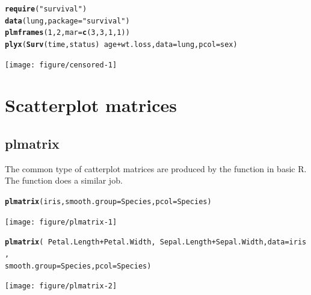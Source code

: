 \documentclass[11pt]{article}\usepackage[]{graphicx}\usepackage[]{color}
\makeatletter
\newcommand{\hlnum}[1]{\textcolor[rgb]{0.686,0.059,0.569}{#1}}%
\newcommand{\hlstr}[1]{\textcolor[rgb]{0.192,0.494,0.8}{#1}}%
\newcommand{\hlopt}[1]{\textcolor[rgb]{0,0,0}{#1}}%
\newcommand{\hlstd}[1]{\textcolor[rgb]{0.345,0.345,0.345}{#1}}%
\newcommand{\hlkwc}[1]{\textcolor[rgb]{0.333,0.667,0.333}{#1}}%
\newcommand{\hlkwd}[1]{\textcolor[rgb]{0.737,0.353,0.396}{\textbf{#1}}}%
\newenvironment{kframe}{%
 \def\at@end@of@kframe{}%
 \ifinner\ifhmode%
  \def\at@end@of@kframe{\end{minipage}}%
  \begin{minipage}{\columnwidth}%
 \fi\fi%
 \def\FrameCommand##1{\hskip\@totalleftmargin \hskip-\fboxsep
 \colorbox{shadecolor}{##1}\hskip-\fboxsep
     \hskip-\linewidth \hskip-\@totalleftmargin \hskip\columnwidth}%
 \MakeFramed {\advance\hsize-\width
   \@totalleftmargin\z@ \linewidth\hsize
   \@setminipage}}%
 {\par\unskip\endMakeFramed%
 \at@end@of@kframe}
\newenvironment{knitrout}{}{} %
\makeatother
\begin{document}
\begin{knitrout}
\color{fgcolor}\begin{kframe}
\begin{alltt}
\hlkwd{require}\hlstd{(}\hlstr{"survival"}\hlstd{)}
\hlkwd{data}\hlstd{(lung,} \hlkwc{package}\hlstd{=}\hlstr{"survival"}\hlstd{)}
\hlkwd{plmframes}\hlstd{(}\hlnum{1}\hlstd{,}\hlnum{2}\hlstd{,}\hlkwc{mar}\hlstd{=}\hlkwd{c}\hlstd{(}\hlnum{3}\hlstd{,}\hlnum{3}\hlstd{,}\hlnum{1}\hlstd{,}\hlnum{1}\hlstd{))}
\hlkwd{plyx}\hlstd{(}\hlkwd{Surv}\hlstd{(time,status)} \hlopt{~} \hlstd{age}\hlopt{+}\hlstd{wt.loss,} \hlkwc{data}\hlstd{=lung,} \hlkwc{pcol}\hlstd{=sex)}
\end{alltt}
\end{kframe}
\texttt{[image: figure/censored-1]} 

\end{knitrout}


\section{Scatterplot matrices}
\subsection{plmatrix}
The common type of catterplot matrices are produced by the  function 
in basic R. The function  does a similar job.

\begin{knitrout}
\color{fgcolor}\begin{kframe}
\begin{alltt}
\hlkwd{plmatrix}\hlstd{(iris,} \hlkwc{smooth.group}\hlstd{=Species,} \hlkwc{pcol}\hlstd{=Species)}
\end{alltt}
\end{kframe}
\texttt{[image: figure/plmatrix-1]} 
\begin{kframe}\begin{alltt}
\hlkwd{plmatrix}\hlstd{(}\hlopt{~}\hlstd{Petal.Length}\hlopt{+}\hlstd{Petal.Width,} \hlopt{~}\hlstd{Sepal.Length}\hlopt{+}\hlstd{Sepal.Width,} \hlkwc{data}\hlstd{=iris,}
         \hlkwc{smooth.group}\hlstd{=Species,} \hlkwc{pcol}\hlstd{=Species)}
\end{alltt}
\end{kframe}
\texttt{[image: figure/plmatrix-2]} 

\end{knitrout}
\end{document}
